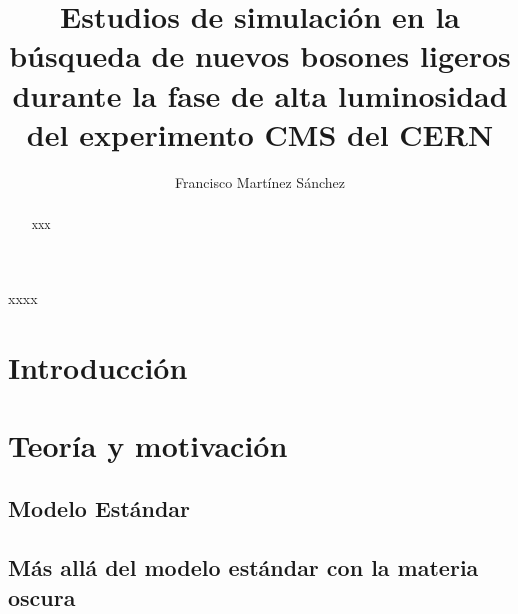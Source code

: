 \documentclass[12pt]{report}
\begin{document}
\title{Estudios de simulación en la búsqueda de nuevos bosones ligeros durante la fase de alta luminosidad del experimento CMS del CERN}
\author{Francisco Martínez Sánchez}
\maketitle
%
\begin{resumen}\thispagestyle{empty}
xxxx
\end{resumen}
\begin{abstract}\thispagestyle{empty}%
xxx
\end{abstract}

\setcounter{page}{1}
\tableofcontents
\clearpage
\listoftables
{}
\clearpage
\listoffigures
{}
\clearpage




\chapter*{Introducción}




\chapter{Teoría y motivación}


	\section{Modelo Estándar} 	
	

	\section{M\'as all\'a del modelo est\'andar con la materia oscura}
	
				
\end{document}
